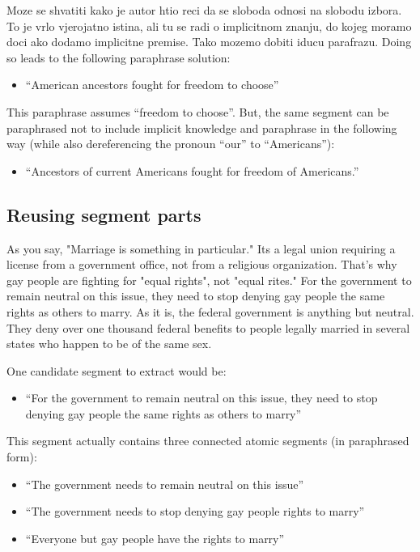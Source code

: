 Moze se shvatiti kako je autor htio reci da se sloboda odnosi na slobodu
izbora. To je vrlo vjerojatno istina, ali tu se radi o implicitnom znanju, do
kojeg moramo doci ako dodamo implicitne premise. Tako mozemo dobiti iducu
parafrazu. Doing so leads to the following paraphrase solution:
\begin{itemize}
\item[] ``American ancestors fought for freedom to choose''
\end{itemize}
This paraphrase assumes ``freedom to choose''. But, the same segment can be
paraphrased not to include implicit knowledge and paraphrase in the following way 
(while also dereferencing the pronoun ``our'' to ``Americans''):
\begin{itemize}
\item[] ``Ancestors of current Americans fought for freedom of Americans.''
\end{itemize}

\subsection{Reusing segment parts}

\begin{mydef}
As you say, "Marriage is something in particular." Its a legal union requiring
a license from a government office, not from a religious organization. That's
why gay people are fighting for "equal rights", not "equal rites."   For the
government to remain neutral on this issue, they need to stop denying gay
people the same rights as others to marry. As it is, the federal government is
anything but neutral. They deny over one thousand federal benefits to people
legally married in several states who happen to be of the same sex.
\end{mydef}
One candidate segment to extract would be:
\begin{itemize}
\item[] ``For the government to remain neutral on this issue, they need to stop
denying gay people the same rights as others to marry''
\end{itemize}
This segment actually contains three connected atomic segments (in paraphrased form):
\begin{itemize}
\item[] ``The government needs to remain neutral on this issue''
\item[] ``The government needs to stop denying gay people rights to marry''
\item[] ``Everyone but gay people have the rights to marry''
\end{itemize}


